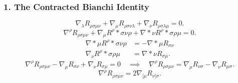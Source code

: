 \documentclass[11pt, a4paper]{report}
\begin{document}
\subsubsection*{1. The Contracted Bianchi Identity}
\begin{equation}
\label{eq:second_bianchi}
\nabla_{\lambda} R_{\rho\sigma\mu\nu} + \nabla_{\mu} R_{\rho\sigma\nu\lambda} + \nabla_{\nu} R_{\rho\sigma\lambda\mu} = 0.
\end{equation}
\begin{equation}
\nabla^{\rho} R_{\rho\sigma\mu\nu} + \nabla_{\mu} {R^{\rho}}*{\sigma\nu\rho} + \nabla*{\nu} {R^{\rho}}*{\sigma\rho\mu} = 0.
\end{equation}
\begin{align}
\nabla*{\mu} {R^{\rho}}*{\sigma\nu\rho} &= -\nabla*{\mu} R_{\sigma\nu} \\
\nabla_{\nu} {R^{\rho}}*{\sigma\rho\mu} &= \nabla*{\nu} R_{\sigma\mu}.
\end{align}
\begin{equation}
\label{eq:riemann_divergence}
\nabla^{\rho} R_{\rho\sigma\mu\nu} - \nabla_{\mu} R_{\sigma\nu} + \nabla_{\nu} R_{\sigma\mu} = 0 \quad \implies \quad \nabla^{\rho} R_{\rho\sigma\mu\nu} = \nabla_{\mu} R_{\nu\sigma} - \nabla_{\nu} R_{\mu\sigma}.
\end{equation}
\begin{equation}
\nabla^{\rho} R_{\rho\sigma\mu\nu} = 2\nabla_{[\mu} R_{\nu]\sigma}.
\end{equation}
\end{document}
